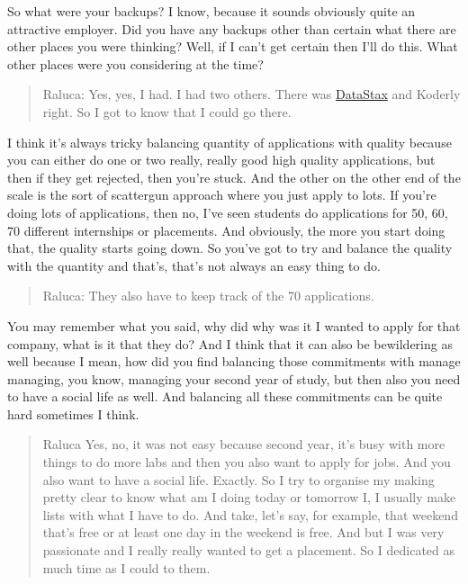 \documentclass[
]{book}
\begin{document}
So what were your backups? I know, because it sounds obviously quite an attractive employer. Did you have any backups other than certain what there are other places you were thinking? Well, if I can't get certain then I'll do this. What other places were you considering at the time?

\begin{quote}
Raluca: Yes, yes, I had. I had two others. There was \href{https://en.wikipedia.org/wiki/DataStax}{DataStax} and Koderly right. So I got to know that I could go there.
\end{quote}

I think it's always tricky balancing quantity of applications with quality because you can either do one or two really, really good high quality applications, but then if they get rejected, then you're stuck. And the other on the other end of the scale is the sort of scattergun approach where you just apply to lots. If you're doing lots of applications, then no, I've seen students do applications for 50, 60, 70 different internships or placements. And obviously, the more you start doing that, the quality starts going down. So you've got to try and balance the quality with the quantity and that's, that's not always an easy thing to do.

\begin{quote}
Raluca: They also have to keep track of the 70 applications.
\end{quote}

You may remember what you said, why did why was it I wanted to apply for that company, what is it that they do? And I think that it can also be bewildering as well because I mean, how did you find balancing those commitments with manage managing, you know, managing your second year of study, but then also you need to have a social life as well. And balancing all these commitments can be quite hard sometimes I think.

\begin{quote}
Raluca Yes, no, it was not easy because second year, it's busy with more things to do more labs and then you also want to apply for jobs. And you also want to have a social life. Exactly. So I try to organise my making pretty clear to know what am I doing today or tomorrow I, I usually make lists with what I have to do. And take, let's say, for example, that weekend that's free or at least one day in the weekend is free. And but I was very passionate and I really really wanted to get a placement. So I dedicated as much time as I could to them.
\end{quote}
\end{document}

